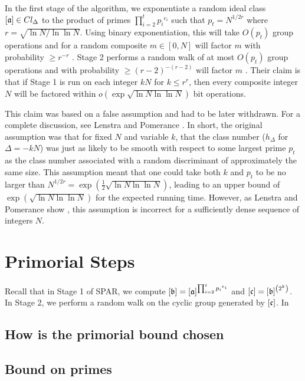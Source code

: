 \documentclass{ucalgthes1}
\theoremstyle{plain}
\theoremstyle{definition}
\begin{document}
In the first stage of the algorithm, we exponentiate a random ideal class $[\mathfrak a] \in Cl_\Delta$ to the product of primes $\prod_{i=2}^t {p_i}^{e_i}$ such that $p_t = N^{1/2r}$ where $r = \sqrt{\ln N / \ln \ln N}$.  Using binary exponentiation, this will take $O(p_t)$ group operations and for a random composite $m \in [0, N]$ will factor $m$ with probability $\ge r^{-r}$ \cite[p.290]{Schnorr1984}. Stage 2 performs a random walk of at most $O(p_t)$ group operations and with probability $\ge (r-2)^{-(r-2)}$ will factor $m$ \cite[p.290]{Schnorr1984}.  Their claim is that if Stage 1 is run on each integer $kN$ for $k \le r^r$, then every composite integer $N$ will be factored within $o\left(\exp \sqrt{ \ln N \ln\ln N } \right)$ bit operations.

This claim was based on a false assumption and had to be later withdrawn.  For a complete discussion, see Lenstra and Pomerance \cite[\S 11]{Lenstra1992}.  In short, the original assumption was that for fixed $N$ and variable $k$, that the class number ($h_\Delta$ for $\Delta = -kN$) was just as likely to be smooth with respect to some largest prime $p_t$ as the class number associated with a random discriminant of approximately the same size.  This assumption meant that one could take both $k$ and $p_t$ to be no larger than $N^{1/2r} = \exp\left(\frac{1}{2}\sqrt{\ln N \ln \ln N}\right)$, leading to an upper bound of $\exp\left(\sqrt{\ln N \ln \ln N}\right)$ for the expected running time.  However, as Lenstra and Pomerance show \cite[\S 11]{Lenstra1992}, this assumption is incorrect for a sufficiently dense sequence of integers $N$.



\section{Primorial Steps}

Recall that in Stage 1 of SPAR, we compute $[\mathfrak b] = [\mathfrak a]^{\prod_{i=2}^t {p_i}^{e_i}}$ and $[\mathfrak c] = [\mathfrak b]^{\left(2^k\right)}$.  In Stage 2, we perform a random walk on the cyclic group generated by $[\mathfrak c]$.  In 

\subsection{How is the primorial bound chosen}

\subsection{Bound on primes}
\end{document}
